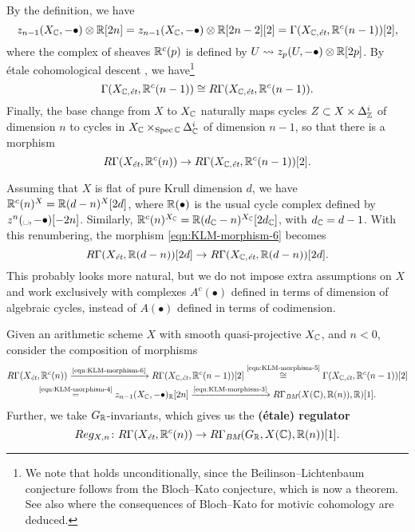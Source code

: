 \documentclass{article}
\numberwithin{equation}{section}
\begin{document}
By the definition, we have
\begin{equation}
  \label{eqn:KLM-morphism-4}
  z_{n-1} (X_\CC, -\bullet) \otimes \RR [2n] =
  z_{n-1} (X_\CC, -\bullet) \otimes \RR [2n-2] [2] =
  \Gamma (X_{\CC,\et}, \RR^c (n-1)) [2],
\end{equation}
where the complex of sheaves $\RR^c (p)$ is defined by
$U \rightsquigarrow z_p (U, -\bullet) \otimes \RR [2p]$.
By étale cohomological descent \cite[Theorem~3.1]{Geisser-2010},
we have\footnote{We note that \cite[Theorem~3.1]{Geisser-2010} holds
  unconditionally, since the Beilinson--Lichtenbaum conjecture follows from
  the Bloch--Kato conjecture, which is now a theorem. See also
  \cite{Geisser-2004-Dedekind} where the consequences of Bloch--Kato for motivic
  cohomology are deduced.}
\begin{equation}
  \label{eqn:KLM-morphism-5}
  \Gamma (X_{\CC,\et}, \RR^c (n-1)) \cong R\Gamma (X_{\CC,\et}, \RR^c (n-1)).
\end{equation}
Finally, the base change from $X$ to $X_\CC$ naturally maps cycles
$Z \subset X \times \Delta_\ZZ^i$ of dimension $n$ to cycles in
$X_\CC \times_{\Spec \CC} \Delta_\CC^i$ of dimension $n-1$, so that there is a
morphism
\begin{equation}
  \label{eqn:KLM-morphism-6}
  R\Gamma (X_\et, \RR^c (n)) \to R\Gamma (X_{\CC,\et}, \RR^c (n-1)) [2].
\end{equation}

\begin{remark}
  Assuming that $X$ is flat of pure Krull dimension $d$, we have
  $\RR^c (n)^X = \RR (d-n)^X [2d]$, where $\RR (\bullet)$ is the usual cycle
  complex defined by $z^n (\text{\textvisiblespace}, -\bullet) [-2n]$.
  Similarly, $\RR^c (n)^{X_\CC} = \RR (d_\CC-n)^{X_\CC} [2d_\CC]$, with
  $d_\CC = d - 1$. With this renumbering, the morphism
  \eqref{eqn:KLM-morphism-6} becomes
  $$R\Gamma (X_\et, \RR (d-n)) [2d] \to R\Gamma (X_{\CC,\et}, \RR (d-n)) [2d].$$
  This probably looks more natural, but we do not impose extra assumptions on
  $X$ and work exclusively with complexes $A^c (\bullet)$ defined in terms of
  dimension of algebraic cycles, instead of $A (\bullet)$ defined in terms of
  codimension.
\end{remark}

\begin{definition}
  Given an arithmetic scheme $X$ with smooth quasi-projective $X_\CC$, and
  $n < 0$, consider the composition of morphisms
  \begin{multline*}
    R\Gamma (X_\et, \RR^c (n)) \xrightarrow{\text{\eqref{eqn:KLM-morphism-6}}}
    R\Gamma (X_{\CC,\et}, \RR^c (n-1)) [2] \stackrel{\text{\eqref{eqn:KLM-morphism-5}}}{\cong}
    \Gamma (X_{\CC,\et}, \RR^c (n-1)) [2] \\
    \stackrel{\text{\eqref{eqn:KLM-morphism-4}}}{=}
    z_{n-1} (X_\CC, -\bullet)_\RR [2n] \xrightarrow{\text{\eqref{eqn:KLM-morphism-3}}}
    R\Gamma_\BM (X (\CC), \RR (n)), \RR) [1].
  \end{multline*}
  Further, we take $G_\RR$-invariants, which gives us the
  \textbf{(étale) regulator}
  \[ Reg_{X,n}\colon R\Gamma (X_\et, \RR^c (n)) \to
    R\Gamma_\BM (G_\RR, X(\CC), \RR (n)) [1]. \]
\end{definition}
\end{document}
